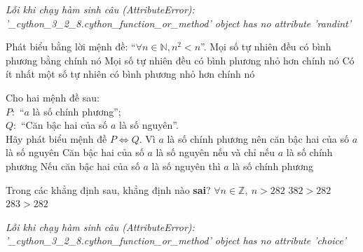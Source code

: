 \documentclass[a4paper,12pt]{article}
\begin{document}
\begin{center}{\small\textit{Lỗi khi chạy hàm sinh câu (AttributeError): '\_cython\_3\_2\_8.cython\_function\_or\_method' object has no attribute 'randint'}}\end{center}

\begin{ex}%
Phát biểu bằng lời mệnh đề:
``$\forall n\in \mathbb{N}, n^2 < n$''.
{Mọi số tự nhiên đều có bình phương bằng chính nó}
{\True Mọi số tự nhiên đều có bình phương nhỏ hơn chính nó}
{Có ít nhất một số tự nhiên có bình phương nhỏ hơn chính nó}


\end{ex}

\begin{ex}%
Cho hai mệnh đề sau:\\
            $P \colon$ ``$a$ là số chính phương'';\\
            $Q \colon$ ``Căn bậc hai của số $a$ là số nguyên''.\\
            Hãy phát biểu mệnh đề $P \Leftrightarrow Q$.
{Vì $a$ là số chính phương nên căn bậc hai của số $a$ là số nguyên}
{\True Căn bậc hai của số $a$ là số nguyên nếu và chỉ nếu $a$ là số chính phương}
{Nếu căn bậc hai của số $a$ là số nguyên thì $a$ là số chính phương}


\end{ex}

\begin{ex}%
Trong các khẳng định sau, khẳng định nào \textbf{sai}?
{\True $\forall n\in\mathbb Z,\ n>282$}
{$382>282$}
{$283>282$}


\end{ex}

\begin{center}\end{center}

\begin{center}{\small\textit{Lỗi khi chạy hàm sinh câu (AttributeError): '\_cython\_3\_2\_8.cython\_function\_or\_method' object has no attribute 'choice'}}\end{center}
\end{document}
